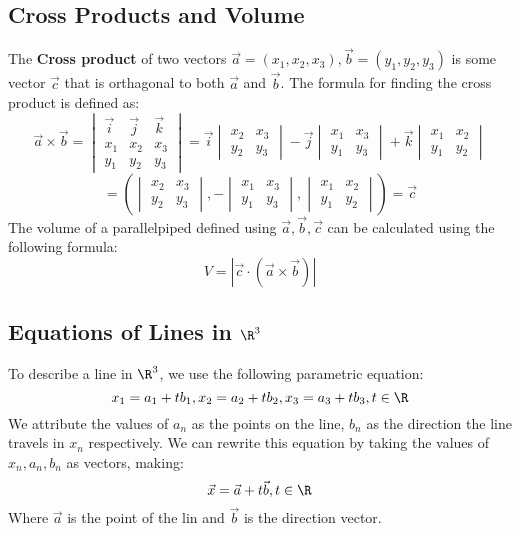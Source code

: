\documentclass[a4paper]{article}
\begin{document}
  \subsection{Cross Products and Volume}
  The \textbf{Cross product} of two vectors $\vec{a} = (x_1,x_2,x_3),\vec{b}=(y_1,y_2,y_3)$ is some vector $\vec{c}$ that is orthagonal to both $\vec{a}$ and $\vec{b}$. The formula for finding the cross product is defined as:
  \[
    \vec{a} \times \vec{b} = 
    \begin{vmatrix}
      \vec{i} & \vec{j} & \vec{k} \\
      x_1 & x_2 & x_3 \\
      y_1 & y_2 & y_3
    \end{vmatrix} = 
    \vec{i}\begin{vmatrix}
      x_2 & x_3 \\
      y_2 & y_3 
    \end{vmatrix} -
    \vec{j}\begin{vmatrix}
      x_1 & x_3 \\
      y_1 & y_3
    \end{vmatrix} +
    \vec{k}\begin{vmatrix}
      x_1 & x_2 \\
      y_1 & y_2
    \end{vmatrix}
  \]
  \[
    = (\begin{vmatrix}
      x_2 & x_3 \\
      y_2 & y_3 
    \end{vmatrix},
    -\begin{vmatrix}
      x_1 & x_3 \\
      y_1 & y_3
    \end{vmatrix},
    \begin{vmatrix}
      x_1 & x_2 \\
      y_1 & y_2
    \end{vmatrix})
    = \vec{c}
  \]
  The volume of a parallelpiped defined using $\vec{a},\vec{b},\vec{c}$ can be calculated using the following formula:
  \[
    V = |\vec{c} \cdot (\vec{a} \times \vec{b})|
  \]
  \subsection[Equations of Lines]{Equations of Lines in $\R^3$}
  To describe a line in $\R^3$, we use the following parametric equation:
  \[
    x_1 = a_1+tb_1, x_2 = a_2 +tb_2, x_3 = a_3 + tb_3, t \in \R
  \]
  We attribute the values of $a_n$ as the points on the line, $b_n$ as the direction the line travels in $x_n$ respectively. We can rewrite this equation by taking the values of $x_n,a_n,b_n$ as vectors, making:
  \[
    \vec{x} = \vec{a} + t\vec{b}, t \in \R
  \]
  Where $\vec{a}$ is the point of the lin and $\vec{b}$ is the direction vector.
\end{document}
